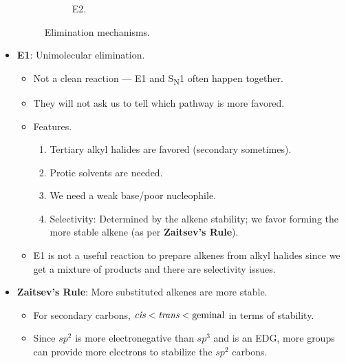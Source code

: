 \documentclass[../notes.tex]{subfiles}
\begin{document}
\begin{itemize}
\begin{figure}[h!]
\begin{subfigure}[b]{\linewidth}
                \arrow
                \+
                \+
            \schemestop
            \caption{E2.}
            \label{fig:eliminationb}
        \end{subfigure}
        \caption{Elimination mechanisms.}
        \label{fig:elimination}
    \end{figure}
    \item \textbf{E1}: Unimolecular elimination.
    \begin{itemize}
        \item Not a clean reaction --- E1 and S\textsubscript{N}1 often happen together.
        \item They will not ask us to tell which pathway is more favored.
        \item Features.
        \begin{enumerate}
            \item Tertiary alkyl halides are favored (secondary sometimes).
            \item Protic solvents are needed.
            \item We need a weak base/poor nucleophile.
            \item Selectivity: Determined by the alkene stability; we favor forming the more stable alkene (as per \textbf{Zaitsev's Rule}).
        \end{enumerate}
        \item E1 is not a useful reaction to prepare alkenes from alkyl halides since we get a mixture of products and there are selectivity issues.
    \end{itemize}
    \item \textbf{Zaitsev's Rule}: More substituted alkenes are more stable.
    \begin{itemize}
        \item For secondary carbons, $\emph{cis}<\emph{trans}<\text{geminal}$ in terms of stability.
        \item Since $sp^2$ is more electronegative than $sp^3$ and  is an EDG, more  groups can provide more electrons to stabilize the $sp^2$ carbons.

\end{itemize}
\end{itemize}
\end{document}
